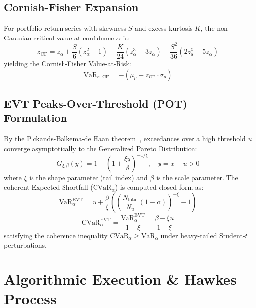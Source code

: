 \documentclass[10pt,journal,compsoc]{IEEEtran}
\begin{document}
\subsection{Cornish-Fisher Expansion}
For portfolio return series with skewness $S$ and excess kurtosis $K$, the non-Gaussian critical value at confidence $\alpha$ is:
\begin{equation}
z_{\text{CF}} = z_\alpha + \frac{S}{6}(z_\alpha^2 - 1) + \frac{K}{24}(z_\alpha^3 - 3z_\alpha) - \frac{S^2}{36}(2z_\alpha^3 - 5z_\alpha)
\end{equation}
yielding the Cornish-Fisher Value-at-Risk:
\begin{equation}
\text{VaR}_{\alpha,\text{CF}} = - (\mu_p + z_{\text{CF}} \cdot \sigma_p)
\end{equation}

\subsection{EVT Peaks-Over-Threshold (POT) Formulation}
By the Pickands-Balkema-de Haan theorem~\cite{balkema1974residual}, exceedances over a high threshold $u$ converge asymptotically to the Generalized Pareto Distribution:
\begin{equation}
G_{\xi, \beta}(y) = 1 - \left(1 + \frac{\xi y}{\beta}\right)^{-1/\xi}, \quad y = x - u > 0
\end{equation}
where $\xi$ is the shape parameter (tail index) and $\beta$ is the scale parameter. The coherent Expected Shortfall ($\text{CVaR}_\alpha$) is computed closed-form as:
\begin{equation}
\text{VaR}_\alpha^{\text{EVT}} = u + \frac{\beta}{\xi} \left( \left(\frac{N_{\text{total}}}{N_u}(1 - \alpha)\right)^{-\xi} - 1 \right)
\end{equation}
\begin{equation}
\text{CVaR}_\alpha^{\text{EVT}} = \frac{\text{VaR}_\alpha^{\text{EVT}}}{1 - \xi} + \frac{\beta - \xi u}{1 - \xi}
\end{equation}
satisfying the coherence inequality $\text{CVaR}_\alpha \ge \text{VaR}_\alpha$ under heavy-tailed Student-$t$ perturbations.

\section{Algorithmic Execution \& Hawkes Process}
\label{sec:execution}
\end{document}
